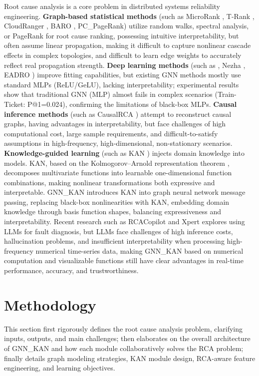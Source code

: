\documentclass[conference]{IEEEtran}
\begin{document}
Root cause analysis is a core problem in distributed systems reliability engineering. \textbf{Graph-based statistical methods} (such as MicroRank \cite{microrank2021}, T-Rank \cite{trank2021}, CloudRanger \cite{cloudranger2018}, BARO \cite{baro2023}, PC\_PageRank) utilize random walks, spectral analysis, or PageRank for root cause ranking, possessing intuitive interpretability, but often assume linear propagation, making it difficult to capture nonlinear cascade effects in complex topologies, and difficult to learn edge weights to accurately reflect real propagation strength. \textbf{Deep learning methods} (such as \cite{gnn_rca2023}, Nezha \cite{nezha2023}, EADRO \cite{eadro2023}) improve fitting capabilities, but existing GNN methods mostly use standard MLPs (ReLU/GeLU), lacking interpretability; experimental results show that traditional GNN (MLP) almost fails in complex scenarios (Train-Ticket: P@1=0.024), confirming the limitations of black-box MLPs. \textbf{Causal inference methods} (such as CausalRCA \cite{causalrca2023}) attempt to reconstruct causal graphs, having advantages in interpretability, but face challenges of high computational cost, large sample requirements, and difficult-to-satisfy assumptions in high-frequency, high-dimensional, non-stationary scenarios. \textbf{Knowledge-guided learning} (such as KAN \cite{kan2024}) injects domain knowledge into models. KAN, based on the Kolmogorov--Arnold representation theorem \cite{kolmogorov1957}, decomposes multivariate functions into learnable one-dimensional function combinations, making nonlinear transformations both expressive and interpretable. GNN\_KAN introduces KAN into graph neural network message passing, replacing black-box nonlinearities with KAN, embedding domain knowledge through basis function shapes, balancing expressiveness and interpretability. Recent research such as RCACopilot \cite{rcacopilot2024} and Xpert \cite{xpert2024} explores using LLMs for fault diagnosis, but LLMs face challenges of high inference costs, hallucination problems, and insufficient interpretability when processing high-frequency numerical time-series data, making GNN\_KAN based on numerical computation and visualizable functions still have clear advantages in real-time performance, accuracy, and trustworthiness.

\section{Methodology}

This section first rigorously defines the root cause analysis problem, clarifying inputs, outputs, and main challenges; then elaborates on the overall architecture of GNN\_KAN and how each module collaboratively solves the RCA problem; finally details graph modeling strategies, KAN module design, RCA-aware feature engineering, and learning objectives.
\end{document}
